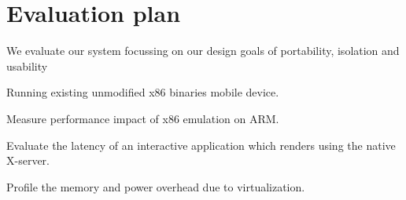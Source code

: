 \section{Evaluation plan}
We evaluate our system focussing on our design goals of portability, isolation and usability
	\begin{itemize*}
	\item Running existing unmodified x86 binaries mobile device.
	\item Measure performance impact of x86 emulation on ARM.
	\item Evaluate the latency of an interactive application which renders using the native X-server.
  \item Profile the memory and power overhead due to virtualization.
	\end{itemize*}
